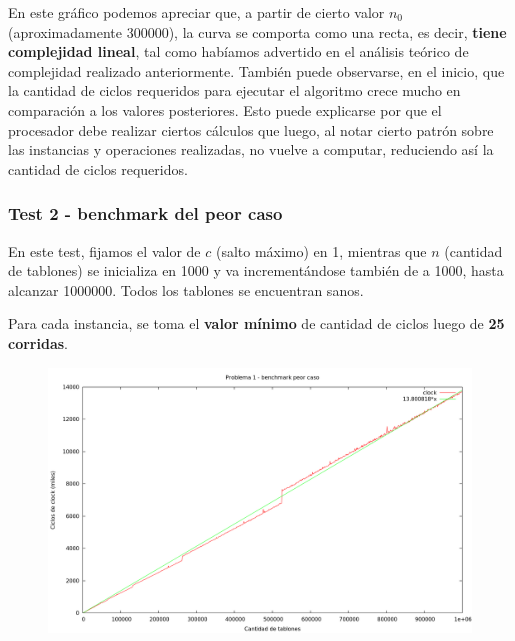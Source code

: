 \vspace*{0.5cm}

En este gráfico podemos apreciar que, a partir de cierto valor $n_0$ (aproximadamente 300000), la 
curva se comporta como una recta, es decir, \textbf{tiene complejidad lineal}, tal como habíamos 
advertido en el análisis teórico de complejidad realizado anteriormente. También puede observarse, en 
el inicio, que la cantidad de ciclos requeridos para ejecutar el algoritmo crece mucho en comparación 
a los valores posteriores. Esto puede explicarse por que el procesador debe realizar ciertos cálculos que 
luego, al notar cierto patrón sobre las instancias y operaciones realizadas, no vuelve a computar, 
reduciendo así la cantidad de ciclos requeridos.


\newpage


\subsubsection{Test 2 - benchmark del peor caso}

En este test, fijamos el valor de $c$ (salto máximo) en 1, mientras que $n$ (cantidad de tablones) 
se inicializa en 1000 y va incrementándose también de a 1000, hasta alcanzar 1000000. Todos los 
tablones se encuentran sanos.

Para cada instancia, se toma el \textbf{valor mínimo} de cantidad de ciclos luego de \textbf{25 corridas}.

\vspace*{0.5cm}

\begin{figure}[h]
  \begin{center}
    \includegraphics[scale=0.35]{imagenes/grafico-1-peor.png}
  \end{center}
\end{figure}

